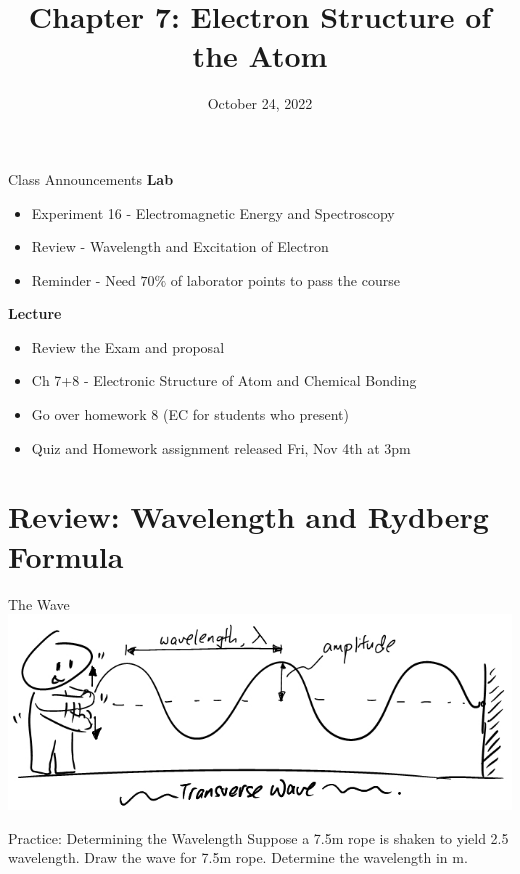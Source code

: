 \documentclass[11pt]{beamer}
\title{Chapter 7: Electron Structure of the Atom}
\institute{Chemistry Department, Cypress College}
\date{October 24, 2022}
\begin{document}
\begin{frame}
  \titlepage
\end{frame}

\begin{frame}{Class Announcements}
  \textbf{Lab}
  \begin{itemize}
  \item Experiment 16 - Electromagnetic Energy and Spectroscopy
  \item Review - Wavelength and Excitation of Electron
  \item Reminder - Need $70\%$ of laborator points to pass
    the course
  \end{itemize}

  \textbf{Lecture}
  \begin{itemize}
  \item Review the Exam and proposal
  \item Ch 7+8 - Electronic Structure of Atom and Chemical Bonding
  \item Go over homework 8 (EC for students who present)
  \item Quiz and Homework assignment released Fri, Nov 4th at 3pm
  \end{itemize}
\end{frame}

\section{Review: Wavelength and Rydberg Formula}

\begin{frame}{The Wave}
  \centering
  \includegraphics[width=\linewidth]{rope_waves}
\end{frame}

\begin{frame}{Practice: Determining the Wavelength}
  Suppose a 7.5m rope is shaken to yield 2.5 wavelength. Draw the
  wave for 7.5m rope. Determine the wavelength in m.
  \vspace{1.5in}
\end{frame}
\end{document}
